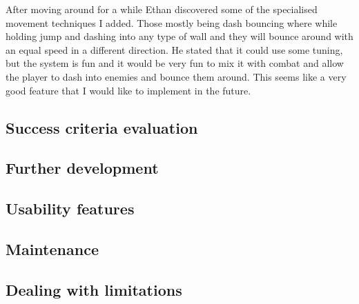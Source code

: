 \documentclass{article}
\begin{document}
After moving around for a while Ethan discovered some of the specialised movement techniques I added. Those mostly being dash bouncing where while holding jump and dashing into any type of wall and they will bounce around with an equal speed in a different direction. He stated that it could use some tuning, but the system is fun and it would be very fun to mix it with combat and allow the player to dash into enemies and bounce them around. This seems like a very good feature that I would like to implement in the future.

\subsection{Success criteria evaluation}

\subsection{Further development}

\subsection{Usability features}

\subsection{Maintenance}

\subsection{Dealing with limitations}

\newpage
\printbibliography
\end{document}
